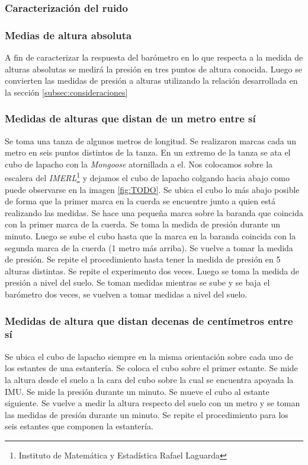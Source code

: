 \documentclass[spanish,12pt,a4paper,titlepage]{report}
\begin{document}
\subsubsection*{Caracterización del ruido}

\subsubsection*{Medias de altura absoluta}
A fin de caracterizar la respuesta del barómetro en lo que respecta a la medida de alturas absolutas se medirá la presión en tres puntos de altura conocida. Luego se convierten las medidas de presión a alturas utilizando la relación desarrollada en la sección \ref{subsec:consideraciones}

\subsubsection*{Medidas de alturas que distan de un metro entre sí}

Se toma una tanza de algunos metros de longitud. Se realizaron marcas cada un metro en seis puntos distintos de la tanza. En un extremo de la tanza se ata el cubo de lapacho con la \emph{Mongoose} atornillada a el. Nos colocamos sobre la escalera del \emph{IMERL}\footnote{Instituto de Matemática y Estadística Rafael Laguarda} y dejamos el cubo de lapacho colgando hacia abajo como puede observarse en la imagen \ref{fig:TODO}. Se ubica el cubo lo más abajo posible de forma que la primer marca en la cuerda se encuentre junto a quien está realizando las medidas. Se hace una pequeña marca sobre la baranda que coincida con la primer marca de la cuerda. Se toma la medida de presión durante un minuto. Luego se sube el cubo hasta que la marca en la baranda coincida con la segunda marca de la cuerda (1 metro más arriba). Se vuelve a tomar la medida de presión. Se repite el procedimiento hasta tener la medida de presión en 5 alturas distintas. 
Se repite el experimento dos veces. Luego se toma la medida de presión a nivel del suelo. Se toman medidas mientras se sube y se baja el barómetro dos veces, se vuelven a tomar medidas a nivel del suelo.
\subsubsection*{Medidas de altura que distan decenas de centímetros entre sí}

Se ubica el cubo de lapacho siempre en la misma orientación sobre cada uno de los estantes de una estantería. Se coloca el cubo sobre el primer estante. Se mide la altura desde el suelo a la cara del cubo sobre la cual se encuentra apoyada la IMU. Se mide la presión durante un minuto. Se mueve el cubo al estante siguiente. Se vuelve a medir la altura respecto del suelo con un metro y se toman las medidas de presión durante un minuto. Se repite el procedimiento para los seis estantes que componen la estantería. 
\end{document}
